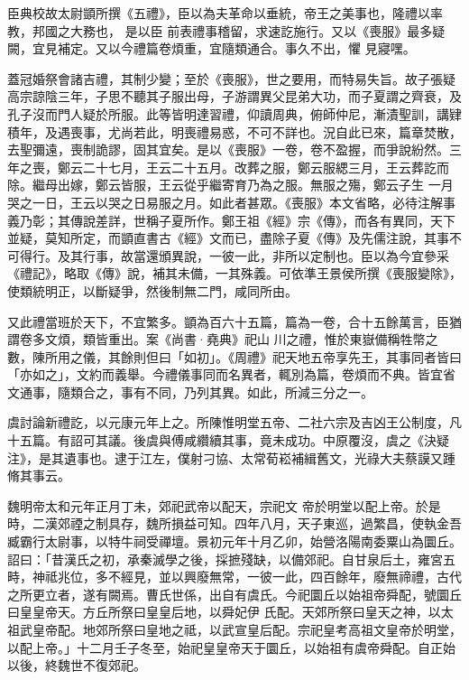 \begin{pinyinscope}
 臣典校故太尉顗所撰《五禮》，臣以為夫革命以垂統，帝王之美事也，隆禮以率教，邦國之大務也，
 是以臣
 前表禮事稽留，求速訖施行。又以《喪服》最多疑闕，宜見補定。又以今禮篇卷煩重，宜隨類通合。事久不出，懼
 見寢嘿。



 蓋冠婚祭會諸吉禮，其制少變；至於《喪服》，世之要用，而特易失旨。故子張疑高宗諒陰三年，子思不聽其子服出母，子游謂異父昆弟大功，而子夏謂之齊衰，及孔子沒而門人疑於所服。此等皆明達習禮，仰讀周典，俯師仲尼，漸漬聖訓，講肄積年，及遇喪事，尤尚若此，明喪禮易惑，不可不詳也。況自此已來，篇章焚散，去聖彌遠，喪制詭謬，固其宜矣。是以《喪服》一卷，卷不盈握，而爭說紛然。三年之喪，鄭云二十七月，王云二十五月。改葬之服，鄭云服緦三月，王云葬訖而除。繼母出嫁，鄭云皆服，王云從乎繼寄育乃為之服。無服之殤，鄭云子生
 一月哭之一日，王云以哭之日易服之月。如此者甚眾。《喪服》本文省略，必待注解事義乃彰；其傳說差詳，世稱子夏所作。鄭王祖《經》宗《傳》，而各有異同，天下並疑，莫知所定，而顗直書古《經》文而已，盡除子夏《傳》及先儒注說，其事不可得行。及其行事，故當還頒異說，一彼一此，非所以定制也。臣以為今宜參采《禮記》，略取《傳》說，補其未備，一其殊義。可依準王景侯所撰《喪服變除》，使類統明正，以斷疑爭，然後制無二門，咸同所由。



 又此禮當班於天下，不宜繁多。顗為百六十五篇，篇為一卷，合十五餘萬言，臣猶謂卷多文煩，類皆重出。案《尚書·堯典》祀山
 川之禮，惟於東嶽備稱牲幣之數，陳所用之儀，其餘則但曰「如初」。《周禮》祀天地五帝享先王，其事同者皆曰「亦如之」，文約而義舉。今禮儀事同而名異者，輒別為篇，卷煩而不典。皆宜省文通事，隨類合之，事有不同，乃列其異。如此，所減三分之一。



 虞討論新禮訖，以元康元年上之。所陳惟明堂五帝、二社六宗及吉凶王公制度，凡十五篇。有詔可其議。後虞與傅咸纘續其事，竟未成功。中原覆沒，虞之《決疑注》，是其遺事也。逮于江左，僕射刁協、太常荀崧補緝舊文，光祿大夫蔡謨又踵脩其事云。



 魏明帝太和元年正月丁未，郊祀武帝以配天，宗祀文
 帝於明堂以配上帝。於是時，二漢郊禋之制具存，魏所損益可知。四年八月，天子東巡，過繁昌，使執金吾臧霸行太尉事，以特牛祠受禪壇。景初元年十月乙卯，始營洛陽南委粟山為圜丘。詔曰：「昔漢氏之初，承秦滅學之後，採摭殘缺，以備郊祀。自甘泉后土，雍宮五畤，神祗兆位，多不經見，並以興廢無常，一彼一此，四百餘年，廢無禘禮，古代之所更立者，遂有闕焉。曹氏世係，出自有虞氏。今祀圜丘以始祖帝舜配，號圜丘曰皇皇帝天。方丘所祭曰皇皇后地，以舜妃伊
 氏配。天郊所祭曰皇天之神，以太祖武皇帝配。地郊所祭曰皇地之祗，以武宣皇后配。宗祀皇考高祖文皇帝於明堂，以配上帝。」十二月壬子冬至，始祀皇皇帝天于圜丘，以始祖有虞帝舜配。自正始以後，終魏世不復郊祀。




\end{pinyinscope}
